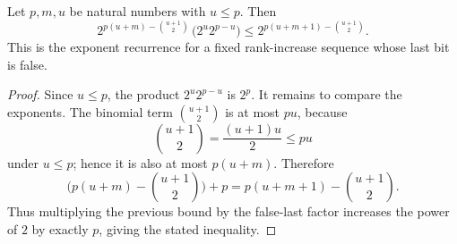 \begin{helper}
Let \(p,m,u\) be natural numbers with \(u\le p\). Then
\[
2^{p(u+m)-\binom{u+1}{2}}\,
  \bigl(2^u2^{p-u}\bigr)
\le
2^{p(u+m+1)-\binom{u+1}{2}}.
\]
This is the exponent recurrence for a fixed rank-increase sequence whose last
bit is false.
\end{helper}
\begin{proof}
Since \(u\le p\), the product \(2^u2^{p-u}\) is \(2^p\). It remains to compare
the exponents. The binomial term \(\binom{u+1}{2}\) is at most \(pu\), because
\[
  \binom{u+1}{2}=\frac{(u+1)u}{2}\le pu
\]
under \(u\le p\); hence it is also at most \(p(u+m)\). Therefore
\[
  \bigl(p(u+m)-\binom{u+1}{2}\bigr)+p
  = p(u+m+1)-\binom{u+1}{2}.
\]
Thus multiplying the previous bound by the false-last factor increases the
power of \(2\) by exactly \(p\), giving the stated inequality.
\end{proof}
